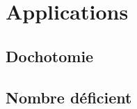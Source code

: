 \section{Applications}
\subsection{Dochotomie}
\setcounter{thequestion}{0}

\subsection{Nombre déficient}
\setcounter{thequestion}{0}

